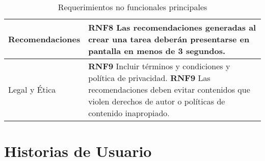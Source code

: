 \documentclass[11pt]{article}
\begin{document}
\begin{table}[H]
\begin{tabular}{|p{3cm}|p{12cm}|}
    \hline
    Recomendaciones & \textbf{RNF8} Las recomendaciones generadas al crear una tarea deberán presentarse en pantalla en menos de \textbf{3 segundos}.\\ 
    \hline
    Legal y Ética & \textbf{RNF9} Incluir términos y condiciones y política de privacidad. \newline
                   \textbf{RNF9} Las recomendaciones deben evitar contenidos que violen derechos de autor o políticas de contenido inapropiado. \\ 
    \hline
    \end{tabular}
    \caption{Requerimientos no funcionales principales}
    \label{tab:nfr}
\end{table}

\section{Historias de Usuario}

\pagebreak
\printbibliography[heading=bibintoc]
\end{document}
